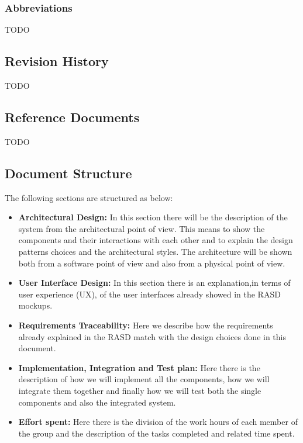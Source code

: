 \documentclass[titlepage]{article}
\begin{document}
\subsubsection{Abbreviations}
TODO
\subsection{Revision History}
TODO
\subsection{Reference Documents}
TODO
\subsection{Document Structure}
The following sections are structured as below:
\begin{itemize}
	\item \textbf{Architectural Design: }In this section there will be the description of the system from the architectural point of view. This means to show the components and their interactions with each other and to explain the design patterns choices and the architectural styles. The architecture will be shown both from a software point of view and also from a physical point of view.
	\item \textbf{User Interface Design:} In this section there is an explanation,in terms of user experience (UX), of the user interfaces already showed in the RASD mockups.
	\item \textbf{Requirements Traceability:} Here we describe how the requirements already explained in the RASD match with the design choices done in this document.
	\item \textbf{Implementation, Integration and Test plan:} Here there is the description of how we will implement all the components, how we will integrate them together and finally how we will test both the single components and also the integrated system.
	\item \textbf{Effort spent:} Here there is the division of the work hours of each member of the group and the description of the tasks completed and related time spent.
\end{itemize}
\end{document}
